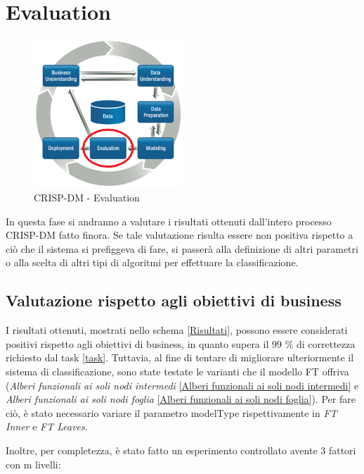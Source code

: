 \chapter{Evaluation}

\begin{figure}[hbtp]
	\centering
	\includegraphics[width=0.5\textwidth]{./images/CRISPDM_5.png}
	\caption{CRISP-DM - Evaluation}
	\label{CRISPDM_5}
\end{figure}
In questa fase si andranno a valutare i risultati ottenuti dall'intero processo CRISP-DM fatto finora. Se tale valutazione risulta essere non positiva rispetto a ciò che il sistema si prefiggeva di fare, si passerà alla definizione di altri parametri o alla scelta di altri tipi di algoritmi per effettuare la classificazione.

\section{Valutazione rispetto agli obiettivi di business}
I risultati ottenuti, mostrati nello schema \ref{Risultati}, possono essere considerati positivi rispetto agli obiettivi di business, in quanto supera il 99 \% di correttezza richiesto dal task \ref{task}. 
Tuttavia, al fine di tentare di migliorare ulteriormente il sistema di classificazione, sono state testate le varianti che il modello FT offriva (\emph{Alberi funzionali ai soli nodi intermedi} \ref{Alberi funzionali ai soli nodi intermedi} e \emph{Alberi funzionali ai soli nodi foglia} \ref{Alberi funzionali ai soli nodi foglia}). Per fare ciò, è stato necessario variare il parametro modelType rispettivamente in \emph{FT Inner} e \emph{FT Leaves}.

Inoltre, per completezza, è stato fatto un esperimento controllato avente 3 fattori con m livelli:

